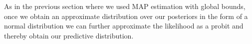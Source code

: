 As in the previous section where we used MAP estimation with global bounds, once we obtain an approximate distribution over our posteriors in the form of a normal distribution we can further approximate the likelihood as a probit and thereby obtain our predictive distribution.
%
%
%
%
%
